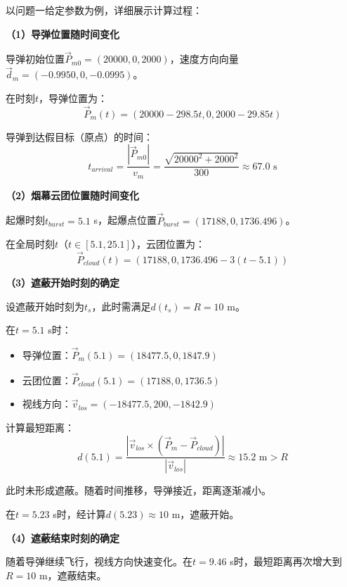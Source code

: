\documentclass[12pt,a4paper]{article}
\begin{document}
\indent 以问题一给定参数为例，详细展示计算过程：

\noindent\textbf{（1）导弹位置随时间变化}

\indent 导弹初始位置$\vec{P}_{m0} = (20000, 0, 2000)$，速度方向向量$\vec{d}_m = (-0.9950, 0, -0.0995)$。

\indent 在时刻$t$，导弹位置为：
\begin{equation}
\vec{P}_m(t) = (20000 - 298.5t, 0, 2000 - 29.85t)
\end{equation}

\indent 导弹到达假目标（原点）的时间：
\begin{equation}
t_{arrival} = \frac{|\vec{P}_{m0}|}{v_m} = \frac{\sqrt{20000^2 + 2000^2}}{300} \approx 67.0 \text{ s}
\end{equation}

\noindent\textbf{（2）烟幕云团位置随时间变化}

\indent 起爆时刻$t_{burst} = 5.1$ s，起爆点位置$\vec{P}_{burst} = (17188, 0, 1736.496)$。

\indent 在全局时刻$t$（$t \in [5.1, 25.1]$），云团位置为：
\begin{equation}
\vec{P}_{cloud}(t) = (17188, 0, 1736.496 - 3(t - 5.1))
\end{equation}

\noindent\textbf{（3）遮蔽开始时刻的确定}

\indent 设遮蔽开始时刻为$t_s$，此时需满足$d(t_s) = R = 10$ m。

\indent 在$t = 5.1$ s时：
\begin{itemize}
\item 导弹位置：$\vec{P}_m(5.1) = (18477.5, 0, 1847.9)$
\item 云团位置：$\vec{P}_{cloud}(5.1) = (17188, 0, 1736.5)$
\item 视线方向：$\vec{v}_{los} = (-18477.5, 200, -1842.9)$
\end{itemize}

\indent 计算最短距离：
\begin{equation}
d(5.1) = \frac{|\vec{v}_{los} \times (\vec{P}_m - \vec{P}_{cloud})|}{|\vec{v}_{los}|} \approx 15.2 \text{ m} > R
\end{equation}

\indent 此时未形成遮蔽。随着时间推移，导弹接近，距离逐渐减小。

\indent 在$t = 5.23$ s时，经计算$d(5.23) \approx 10$ m，遮蔽开始。

\noindent\textbf{（4）遮蔽结束时刻的确定}

\indent 随着导弹继续飞行，视线方向快速变化。在$t = 9.46$ s时，最短距离再次增大到$R = 10$ m，遮蔽结束。
\end{document}
